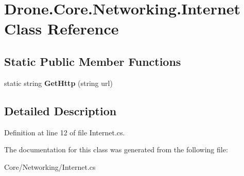 \hypertarget{class_drone_1_1_core_1_1_networking_1_1_internet}{}\section{Drone.\+Core.\+Networking.\+Internet Class Reference}
\label{class_drone_1_1_core_1_1_networking_1_1_internet}
\subsection*{Static Public Member Functions}
\begin{DoxyCompactItemize}
\item 
\hypertarget{class_drone_1_1_core_1_1_networking_1_1_internet_a89284b4bba47b5337467734807c6b4cb}{}static string {\bfseries Get\+Http} (string url)\label{class_drone_1_1_core_1_1_networking_1_1_internet_a89284b4bba47b5337467734807c6b4cb}

\end{DoxyCompactItemize}


\subsection{Detailed Description}


Definition at line 12 of file Internet.\+cs.



The documentation for this class was generated from the following file\+:\begin{DoxyCompactItemize}
\item 
Core/\+Networking/Internet.\+cs\end{DoxyCompactItemize}
